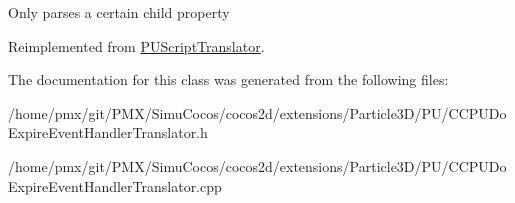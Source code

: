 Only parses a certain child property 

Reimplemented from \hyperlink{classPUScriptTranslator_a0374d83a8a04e57918975d525e0f8fe8}{P\+U\+Script\+Translator}.



The documentation for this class was generated from the following files\+:\begin{DoxyCompactItemize}
\item 
/home/pmx/git/\+P\+M\+X/\+Simu\+Cocos/cocos2d/extensions/\+Particle3\+D/\+P\+U/C\+C\+P\+U\+Do\+Expire\+Event\+Handler\+Translator.\+h\item 
/home/pmx/git/\+P\+M\+X/\+Simu\+Cocos/cocos2d/extensions/\+Particle3\+D/\+P\+U/C\+C\+P\+U\+Do\+Expire\+Event\+Handler\+Translator.\+cpp\end{DoxyCompactItemize}
